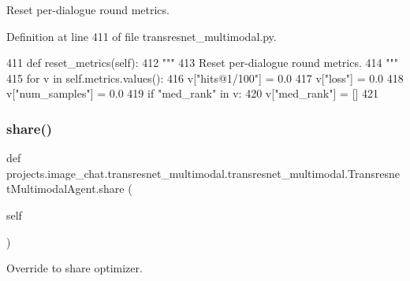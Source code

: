 \begin{DoxyVerb}Reset per-dialogue round metrics.
\end{DoxyVerb}
 

Definition at line 411 of file transresnet\+\_\+multimodal.\+py.


\begin{DoxyCode}
411     \textcolor{keyword}{def }reset\_metrics(self):
412         \textcolor{stringliteral}{"""}
413 \textcolor{stringliteral}{        Reset per-dialogue round metrics.}
414 \textcolor{stringliteral}{        """}
415         \textcolor{keywordflow}{for} v \textcolor{keywordflow}{in} self.metrics.values():
416             v[\textcolor{stringliteral}{"hits@1/100"}] = 0.0
417             v[\textcolor{stringliteral}{"loss"}] = 0.0
418             v[\textcolor{stringliteral}{"num\_samples"}] = 0.0
419             \textcolor{keywordflow}{if} \textcolor{stringliteral}{"med\_rank"} \textcolor{keywordflow}{in} v:
420                 v[\textcolor{stringliteral}{"med\_rank"}] = []
421 
\end{DoxyCode}
\mbox{\label{classprojects_1_1image__chat_1_1transresnet__multimodal_1_1transresnet__multimodal_1_1TransresnetMultimodalAgent_a645c89d60d3358862f86d192f92a2313}} 
\subsubsection{\texorpdfstring{share()}{share()}}
{\footnotesize\ttfamily def projects.\+image\+\_\+chat.\+transresnet\+\_\+multimodal.\+transresnet\+\_\+multimodal.\+Transresnet\+Multimodal\+Agent.\+share (\begin{DoxyParamCaption}\item[{}]{self }\end{DoxyParamCaption})}

\begin{DoxyVerb}Override to share optimizer.
\end{DoxyVerb}
 

